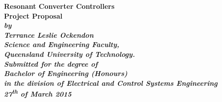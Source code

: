 \begin{titlepage}
\renewcommand{\baselinestretch}{1.0}
\begin{center}
\vspace*{35mm}
\Huge\bf
		Resonant Converter Controllers\\
\huge 
\rm
        Project Proposal\\
\vspace{20mm}
\large\sl
		by\\
		Terrance Leslie Ockendon
		\medskip\\
\rm
		Science and Engineering Faculty,\\
		Queensland University of Technology.\\
\vspace{30mm}
		Submitted for the degree of\\
		Bachelor of Engineering (Honours)
		\smallskip\\
\normalsize
		in the division of Electrical and Control Systems Engineering
		\medskip\\
\large
		27\textsuperscript{th} of March 2015
\end{center}
\end{titlepage}
